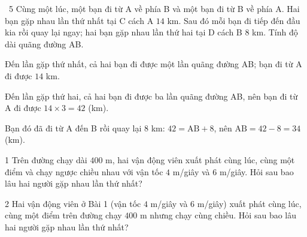 \begin{exbox}{\ExWord\ 5}
Cùng một lúc, một bạn đi từ A về phía B và một bạn đi từ B về phía A. Hai bạn gặp nhau lần thứ nhất tại C cách A $14$ km. Sau đó mỗi bạn đi tiếp đến đầu kia rồi quay lại ngay; hai bạn gặp nhau lần thứ hai tại D cách B $8$ km. Tính độ dài quãng đường AB.
\guide
\begin{center}
\end{center}
Đến lần gặp thứ nhất, cả hai bạn đi được một lần quãng đường AB; bạn đi từ A đi được $14$ km.\par
Đến lần gặp thứ hai, cả hai bạn đi được ba lần quãng đường AB, nên bạn đi từ A đi được $14\times3=42$ (km).\par
Bạn đó đã đi từ A đến B rồi quay lại $8$ km: $42=\text{AB}+8$, nên $\text{AB}=42-8=34$ (km).
\end{exbox}
\begin{probbox}{1}{\relax}
Trên đường chạy dài $400$ m, hai vận động viên xuất phát cùng lúc, cùng một điểm và chạy ngược chiều nhau với vận tốc $4$ m/giây và $6$ m/giây. Hỏi sau bao lâu hai người gặp nhau lần thứ nhất?
\end{probbox}
\gap
\begin{probbox}{2}{\relax}
Hai vận động viên ở Bài 1 (vận tốc $4$ m/giây và $6$ m/giây) xuất phát cùng lúc, cùng một điểm trên đường chạy $400$ m nhưng chạy cùng chiều. Hỏi sau bao lâu hai người gặp nhau lần thứ nhất?
\end{probbox}
